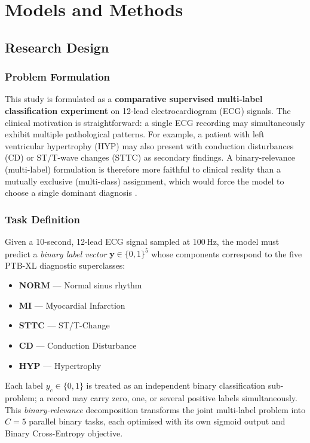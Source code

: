 ﻿\chapter{Models and Methods}
\label{chap:02}
\setlength{\parskip}{1em}

\section{Research Design}
\label{sec:research_design}

\subsection{Problem Formulation}

This study is formulated as a \textbf{comparative supervised multi-label
classification experiment} on 12-lead electrocardiogram (ECG) signals.
The clinical motivation is straightforward: a single ECG recording may
simultaneously exhibit multiple pathological patterns.
For example, a patient with left ventricular hypertrophy (HYP) may also
present with conduction disturbances (CD) or ST/T-wave changes (STTC)
as secondary findings.
A binary-relevance (multi-label) formulation is therefore more faithful
to clinical reality than a mutually exclusive (multi-class) assignment,
which would force the model to choose a single dominant diagnosis
\cite{ref19,ref7}.

\subsection*{Task Definition}

Given a 10-second, 12-lead ECG signal sampled at 100\,Hz, the model
must predict a \emph{binary label vector}
$\mathbf{y} \in \{0,1\}^{5}$ whose components correspond to the five
PTB-XL diagnostic superclasses:

\begin{itemize}
  \item \textbf{NORM} --- Normal sinus rhythm
  \item \textbf{MI}   --- Myocardial Infarction
  \item \textbf{STTC} --- ST/T-Change
  \item \textbf{CD}   --- Conduction Disturbance
  \item \textbf{HYP}  --- Hypertrophy
\end{itemize}

\noindent Each label $y_c \in \{0,1\}$ is treated as an independent
binary classification sub-problem; a record may carry zero, one, or
several positive labels simultaneously.
This \emph{binary-relevance} decomposition transforms the joint
multi-label problem into $C = 5$ parallel binary tasks, each optimised
with its own sigmoid output and Binary Cross-Entropy objective.

